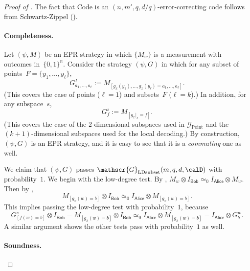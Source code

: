 \documentclass[11pt]{article}
\newcommand{\codec}{\mathrm{Code}}
\newcommand{\consistency}{\simeq}
\newcommand{\game}{\mathscr{G}}
\newcommand{\reg}[1]{{\mathsf{#1}}}
\begin{document}
\begin{proof}[Proof of ]
The fact that $\codec$ is an $(n, m', q, d/q)$-error-correcting code follows from Schwartz-Zippel ().

\paragraph{Completeness.}
Let $(\psi, M)$ be an EPR strategy in which $\{M_w\}$ is a measurement with outcomes in~$\{0, 1\}^n$.
Consider the strategy $(\psi, G)$ in which for any subset of points~$F = \{y_1, \ldots, y_\ell\}$,
\begin{equation*}
	G^I_{a_1, \ldots, a_\ell} := M_{[g_x(y_1), \ldots, g_x(y_\ell) = a_1, \ldots, a_\ell]}.
\end{equation*}
(This covers the case of points ($\ell = 1$) and subsets~$F$ ($\ell = k$).)
In addition, for any subspace~$s$,
\begin{equation*}
	G^s_{f} := M_{[g_x|_s = f]}.
\end{equation*}
(This covers the case of the $2$-dimensional subspaces used in $\game_{\mathrm{Point}}$
and the $(k+1)$-dimensional subspaces used for the local decoding.)
By construction, $(\psi, G)$ is an EPR strategy,
and it is easy to see that it is a \emph{commuting} one as well.

We claim that $(\psi, G)$ passes $\game_{\mathrm{LDsubset}}(m, q, d, \calD)$ with probability~$1$.
We begin with the low-degree test.
By ,
$M_w \otimes I_{\reg{Bob}} \consistency_0 I_{\reg{Alice}} \otimes M_w$.
Then by ,
\begin{equation*}
M_{[g_x(w) = b]} \otimes I_{\reg{Bob}}
\consistency_{0} I_{\reg{Alice}} \otimes M_{[g_x(w) = b]}.
\end{equation*}
This implies passing the low-degree test with probability~$1$, because
\begin{equation*}
G^s_{[f(w) = b]} \otimes I_{\reg{Bob}}
= M_{[g_x(w) = b]} \otimes I_{\reg{Bob}}
\consistency_{0} I_{\reg{Alice}} \otimes M_{[g_x(w) = b]} = I_{\reg{Alice}} \otimes G^w_b.
\end{equation*}
A similar argument shows the other tests pass with probability~$1$ as well.

\paragraph{Soundness.}


\end{proof}
\end{document}
